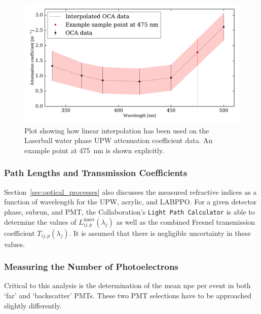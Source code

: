 \begin{figure}
    \centering
    \includegraphics[width=\textwidth]{5_SMELLIEAnalysis/images/OCA_water_atten_coeffs_with_interploation.pdf}
    \caption[Linear interpolation being used on Laserball UPW attenuation coefficient data]
    {Plot showing how linear interpolation has been used on the Laserball water phase UPW attenuation coefficient data. An example point at \SI{475}{\nm} is shown explicitly.}
    \label{fig:smellie_laserball_water_ext_length_est}
\end{figure}

\subsubsection{Path Lengths and Transmission Coefficients}
Section~\ref{sec:optical_processes} also discusses the measured refractive indices as a function of wavelength for the UPW, acrylic, and LABPPO. For a given detector phase, subrun, and PMT, the Collaboration's \texttt{Light Path Calculator} is able to determine the values of $L_{ij,p}^{\mathrm{inner}}(\lambda_{j})$ as well as the combined Fresnel transmission coefficient $T_{ij,p}(\lambda_{j})$. It is assumed that there is negligible uncertainty in these values.

\subsubsection{Measuring the Number of Photoelectrons}
Critical to this analysis is the determination of the mean npe per event in both `far' and `backscatter' PMTs. These two PMT selections have to be approached slightly differently.

